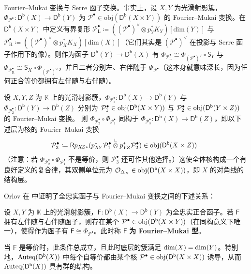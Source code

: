 \begin{Rem}
	Fourier--Mukai 变换与 Serre 函子交换。事实上，设 $X,Y$ 为光滑射影簇，$\Phi_{\mathcal{P}^\bullet}:\mathsf{D^b}(X)\rightarrow\mathsf{D^b}(Y)$ 为 $\mathcal{P}^\bullet\in\text{obj}(\mathsf{D^b}(X\times Y))$ 的 Fourier--Mukai 变换。在 $\mathsf{D^b}(X\times Y)$ 中定义有界复形 $\mathcal{P}_\text{L}^\bullet\coloneqq((\mathcal{P}^\bullet)^\vee\otimes p_Y^*K_Y)[\text{dim}(Y)]$ 与 $\mathcal{P}_\text{R}^\bullet\coloneqq((\mathcal{P}^\bullet)^\vee\otimes p_X^*K_X)[\text{dim}(X)]$（它们其实是 $(\mathcal{P}^\bullet)^\vee$ 在投影与 Serre 函子作用下的像）。则作为函子 $\mathsf{D^b}(Y)\rightarrow\mathsf{D^b}(X)$ 有 $\Phi_{\mathcal{P}_\text{L}^\bullet}\cong \Phi_{(\mathcal{P}^\bullet)^\vee}\circ\mathsf{S}_Y$ 与 $\Phi_{\mathcal{P}_\text{R}^\bullet}\cong \mathsf{S}_X\circ\Phi_{(\mathcal{P}^\bullet)^\vee}$，并且二者分别左、右伴随于 $\Phi_{\mathcal{P}^\bullet}$（这本身就意味深长，因为任何正合等价都拥有左伴随与右伴随）。
\end{Rem}

\begin{Lem}
	设 $X,Y,Z$ 为 $\mathbb{K}$ 上的光滑射影簇，$\Phi_{\mathcal{P}_1^\bullet}:\mathsf{D^b}(X)\rightarrow\mathsf{D^b}(Y)$ 与 $\Phi_{\mathcal{P}_2^\bullet}:\mathsf{D^b}(Y)\rightarrow\mathsf{D^b}(Z)$ 分别为 $\mathcal{P}_1^\bullet\in\textup{obj}(\mathsf{D^b}(X\times Y))$ 与 $\mathcal{P}_2^\bullet\in\textup{obj}(\mathsf{D^b}(Y\times Z))$ 的 Fourier--Mukai 变换。
	则 $\Phi_{\mathcal{P}_2^\bullet}\circ \Phi_{\mathcal{P}_1^\bullet}$ 同构于 $\Phi_{\mathcal{P}_3^\bullet}:\mathsf{D^b}(X)\rightarrow\mathsf{D^b}(Z)$，即以下述层为核的 Fourier--Mukai 变换
	\[
	\mathcal{P}_3^\bullet\coloneqq \mathsf{R}p_{X\!Z*}(p_{X\!Y}^*\mathcal{P}_1^\bullet\overset{\mathsf{L}}{\otimes} p_{Y\!Z}^*\mathcal{P}_2^\bullet)\in\textup{obj}(\mathsf{D^b}(X\times Z))\,.
	\]
	（注意：若 $\Phi_{\mathcal{P}_2^\bullet}\circ \Phi_{\mathcal{P}_1^\bullet}$ 不是等价，则 $\mathcal{P}_3^\bullet$ 还可作其他选择。）这使全体核构成一个有良好定义的复合律，其双侧单位元为 $\mathcal{O}_{\Delta_X}\in\textup{obj}(\mathsf{D^b}(X\times X))$，即 $X$ 的对角线的结构层。
\end{Lem}

Orlov 在 \cite{[Orl03]} 中证明了全忠实函子与 Fourier--Mukai 变换之间的下述关系：

\begin{Thm}\label{Orlovthm}
	设 $X,Y$ 为 $\mathbb{K}$ 上的光滑射影簇，$\mathsf{F}:\mathsf{D^b}(X)\rightarrow\mathsf{D^b}(Y)$ 为全忠实正合函子。若 $\mathsf{F}$ 拥有左伴随与右伴随函子，则存在某个 $\mathcal{P}^\bullet\in\textup{obj}(\mathsf{D^b}(X\times Y))$（在同构意义下唯一），使得作为函子有 $\mathsf{F}\cong\Phi_{\mathcal{P}^\bullet}$。此时称 $\mathsf{F}$ \textbf{为 Fourier--Mukai 型}。

	当 $\mathsf{F}$ 是等价时，此条件总成立，且此时底层的簇满足 $\textup{dim}(X)=\textup{dim}(Y)$。特别地，$\textup{Auteq}(\mathsf{D^b}(X))$ 中每个自等价都由某个核 $\mathcal{P}^\bullet\in\textup{obj}(\mathsf{D^b}(X\times X))$ 诱导，从而 $\textup{Auteq}(\mathsf{D^b}(X))$ 具有群的结构。
\end{Thm}

